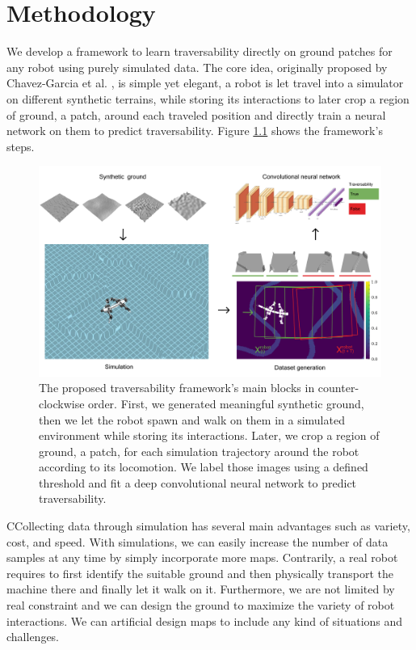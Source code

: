 \documentclass[../document.tex]{subfiles}
\begin{document}
\chapter{Methodology}
We develop a framework to learn traversability directly on ground patches for any robot using purely simulated data. The core idea, originally proposed by Chavez-Garcia et al. \cite{omar2018traversability}, is simple yet elegant, a robot is let travel into a simulator on different synthetic terrains, while storing its interactions to later crop a region of ground, a patch, around each traveled position and directly train a neural network on them to predict traversability. Figure \ref{fig : pipeline} shows the framework's steps.
\begin{figure}[H]
    \centering
        \includegraphics[width=\textwidth]{../img/method.png}
    \caption{The proposed traversability framework's main blocks in counter-clockwise order. First, we generated meaningful synthetic ground, then we let the robot spawn and walk on them in a simulated environment while storing its interactions. Later, we crop a region of ground, a patch, for each simulation trajectory around the robot according to its locomotion. We label those images using a defined threshold and fit a deep convolutional neural network to predict traversability. }
    \label{fig : pipeline}
    \end{figure}
CCollecting data through simulation has several main advantages such as variety, cost, and speed. With simulations, we can easily increase the number of data samples at any time by simply incorporate more maps. Contrarily, a real robot requires to first identify the suitable ground and then physically transport the machine there and finally let it walk on it.
Furthermore, we are not limited by real constraint and we can design the ground to maximize the variety of robot interactions. We can artificial design maps to include any kind of situations and challenges.
\end{document}
